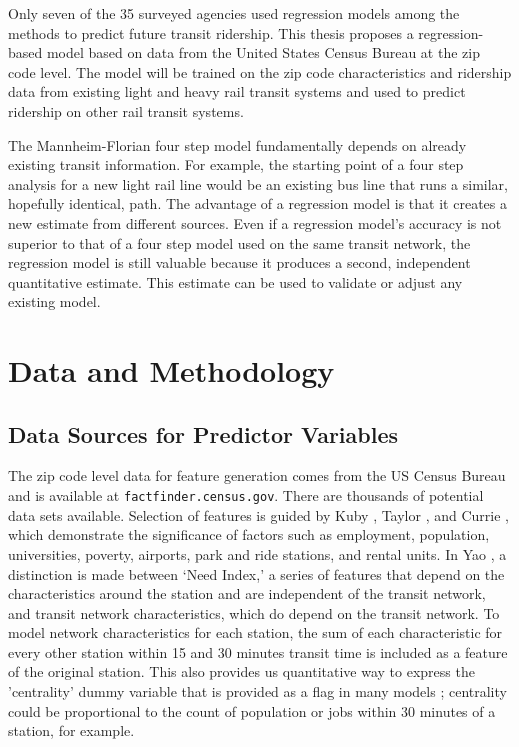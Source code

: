 \documentclass{article}
\begin{document}
Only seven of the 35 surveyed agencies used regression models among the methods to predict future transit ridership. This thesis proposes a regression-based model based on data from the United States Census Bureau at the zip code level. The model will be trained on the zip code characteristics and ridership data from existing light and heavy rail transit systems and used to predict ridership on other rail transit systems.  

The Mannheim-Florian four step model fundamentally depends on already existing transit information. For example, the starting point of a four step analysis for a new light rail line would be an existing bus line that runs a similar, hopefully identical, path. The advantage of a regression model is that it creates a new estimate from different sources. Even if a regression model's accuracy is not superior to that of a four step model used on the same transit network, the regression model is still valuable because it produces a second, independent quantitative estimate. This estimate can be used to validate or adjust any existing model. 


\section{Data and Methodology}

\subsection{Data Sources for Predictor Variables}

The zip code level data for feature generation comes from the US Census Bureau and is available at \texttt{factfinder.census.gov}. There are thousands of potential data sets available. Selection of features is guided by Kuby \cite{Kuby2004}, Taylor \cite{Taylor2008}, and Currie \cite{Currie2011}, which demonstrate the significance of factors such as employment, population, universities, poverty, airports, park and ride stations, and rental units. In Yao \cite{Yao2007}, a distinction is made between `Need Index,' a series of features that depend on the characteristics around the station and are independent of the transit network, and transit network characteristics, which do depend on the transit network. To model network characteristics for each station, the sum of each characteristic for every other station within 15 and 30 minutes transit time is included as a feature of the original station. This also provides us quantitative way to express the 'centrality' dummy variable that is provided as a flag in many models \cite{Kuby2004, Durning2015}; centrality could be proportional to the count of population or jobs within 30 minutes of a station, for example.
\end{document}
